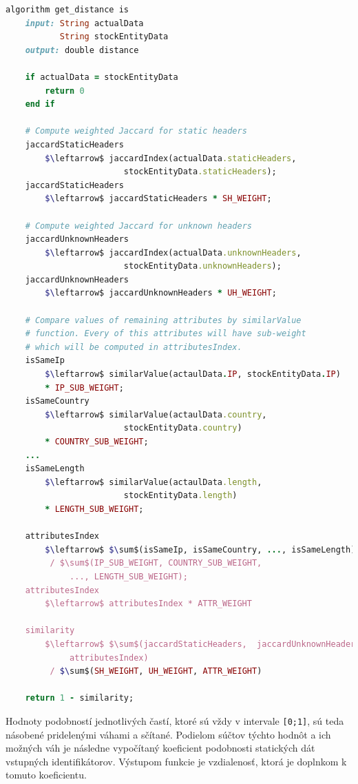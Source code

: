 \documentclass[
  printed, %
  table,   %
  lof,     %
  nolot,   %
  nocover
]{fithesis3}
\begin{document}
\vspace{6mm}
\begin{lstlisting}[basicstyle=\footnotesize, language=Ruby, mathescape=true]
algorithm get_distance is
    input: String actualData
           String stockEntityData
    output: double distance

    if actualData = stockEntityData
        return 0
    end if

    # Compute weighted Jaccard for static headers
    jaccardStaticHeaders 
    	$\leftarrow$ jaccardIndex(actualData.staticHeaders, 
    	                stockEntityData.staticHeaders);
    jaccardStaticHeaders 
    	$\leftarrow$ jaccardStaticHeaders * SH_WEIGHT;

    # Compute weighted Jaccard for unknown headers
    jaccardUnknownHeaders 
    	$\leftarrow$ jaccardIndex(actualData.unknownHeaders,
    	                stockEntityData.unknownHeaders);
    jaccardUnknownHeaders 
    	$\leftarrow$ jaccardUnknownHeaders * UH_WEIGHT;

    # Compare values of remaining attributes by similarValue
    # function. Every of this attributes will have sub-weight
    # which will be computed in attributesIndex.
    isSameIp 
    	$\leftarrow$ similarValue(actaulData.IP, stockEntityData.IP)
    	* IP_SUB_WEIGHT;
    isSameCountry 
    	$\leftarrow$ similarValue(actaulData.country, 
    	                stockEntityData.country)
    	* COUNTRY_SUB_WEIGHT;
    ...
    isSameLength 
    	$\leftarrow$ similarValue(actaulData.length, 
    	                stockEntityData.length)
    	* LENGTH_SUB_WEIGHT;

    attributesIndex 
    	$\leftarrow$ $\sum$(isSameIp, isSameCountry, ..., isSameLength) 
    	 / $\sum$(IP_SUB_WEIGHT, COUNTRY_SUB_WEIGHT,
    	     ..., LENGTH_SUB_WEIGHT);
    attributesIndex 
    	$\leftarrow$ attributesIndex * ATTR_WEIGHT

    similarity 
    	$\leftarrow$ $\sum$(jaccardStaticHeaders,  jaccardUnknownHeaders,
    	     attributesIndex) 
    	 / $\sum$(SH_WEIGHT, UH_WEIGHT, ATTR_WEIGHT)

    return 1 - similarity;
\end{lstlisting}

Hodnoty podobností jednotlivých častí, ktoré sú vždy v intervale \texttt{[0;1]}, sú teda násobené pridelenými váhami a
sčítané. Podielom súčtov týchto hodnôt a ich možných váh je následne vypočítaný
koeficient podobnosti statických dát vstupných identifikátorov. Výstupom 
funkcie je vzdialenosť, ktorá je doplnkom k tomuto koeficientu.
\end{document}
